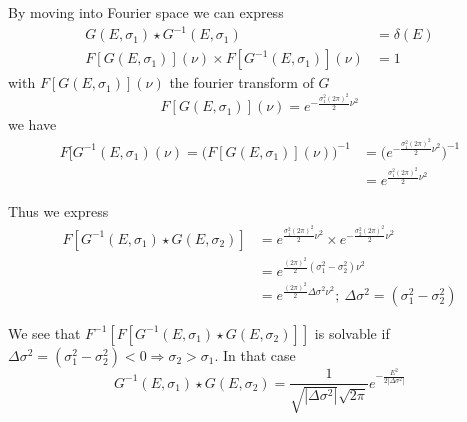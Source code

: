 \documentclass[../main.tex]{subfiles}
\begin{document}
By moving into Fourier space we can express
\begin{align}
  G(E, \sigma_1) \star G^{-1}(E, \sigma_1) &= \delta(E) \\
  F[G(E, \sigma_1)](\nu) \times F[G^{-1}(E, \sigma_1)](\nu) &= 1
\end{align}
with $F[G(E, \sigma_1)](\nu)$ the fourier transform of $G$
\begin{equation}
  F[G(E, \sigma_1)](\nu) = e^{-\frac{\sigma_1^2(2\pi)^2}{2}\nu^2}
\end{equation}
we have
\begin{align}
  F[G^{-1}(E, \sigma_1)(\nu) = \big( F[G(E, \sigma_1)](\nu) \big)^{-1} &= \big( e^{-\frac{\sigma_1^2(2\pi)^2}{2}\nu^2} \big)^{-1} \\
                                                                       &= e^{\frac{\sigma_1^2(2\pi)^2}{2}\nu^2}
\end{align}

Thus we express
\begin{align}
  F[G^{-1}(E, \sigma_1) \star G(E, \sigma_2)] &= e^{\frac{\sigma_1^2(2\pi)^2}{2}\nu^2} \times e^{-\frac{\sigma_2^2(2\pi)^2}{2}\nu^2} \\
                                              &= e^{\frac{(2\pi)^2}{2}(\sigma_1^2 - \sigma^2_2)\nu^2} \\
                                              &= e^{\frac{(2\pi)^2}{2}\Delta\sigma^2\nu^2}; ~ \Delta\sigma^2 = (\sigma_1^2 - \sigma^2_2)
\end{align}

We see that $F^{-1}[F[G^{-1}(E, \sigma_1) \star G(E, \sigma_2)]]$ is solvable if $\Delta\sigma^2 = (\sigma_1^2 - \sigma^2_2) < 0 \Rightarrow \sigma_2 > \sigma_1$. In that case
\begin{equation}
  G^{-1}(E, \sigma_1) \star G(E, \sigma_2) = \frac{1}{\sqrt{|\Delta \sigma^2|}\sqrt{2\pi}} e^{-\frac{E^2}{2|\Delta \sigma^2|}}
\end{equation}
\end{document}
